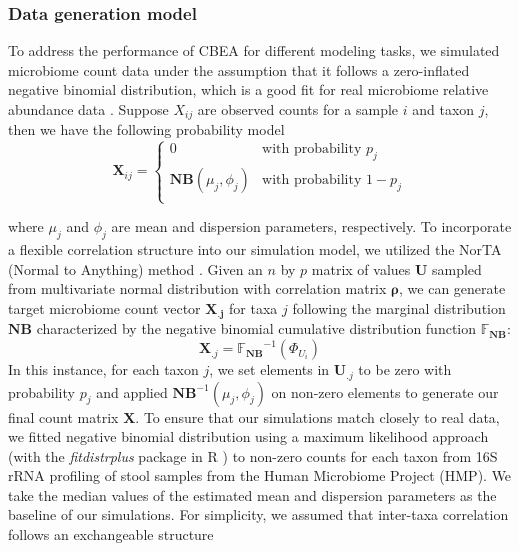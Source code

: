 \documentclass[10pt,letterpaper]{article}
\begin{document}
\subsubsection*{Data generation model}  
To address the performance of CBEA for different modeling tasks, we simulated microbiome count data under the assumption that it follows a zero-inflated negative binomial distribution, which is a good fit for real microbiome relative abundance data \cite{calgaro2020}. Suppose $X_{ij}$ are observed counts for a sample $i$ and taxon $j$, then we have the following probability model
\begin{equation}
    \mathbf{X}_{ij} =
      \begin{cases}
        0 & \text{with probability $p_j$}\\
        \mathbf{NB}(\mu_j, \phi_j) & \text{with probability $1 - p_j$}\\
      \end{cases}       
\end{equation}

where $\mu_j$ and $\phi_j$ are mean and dispersion parameters, respectively. To incorporate a flexible correlation structure into our simulation model, we utilized the NorTA (Normal to Anything) method \cite{cario1997}. Given an $n$ by $p$ matrix of values $\mathbf{U}$ sampled from multivariate normal distribution with correlation matrix $\mathbf{\rho}$, we can generate target microbiome count vector $\mathbf{X_{.j}}$ for taxa $j$ following the marginal distribution $\mathbf{NB}$ characterized by the negative binomial cumulative distribution function $\mathbb{F_{\mathbf{NB}}}$:
\begin{equation}
    \mathbf{X}_{.j} = \mathbb{F_{\mathbf{NB}}}^{-1}(\Phi_{U_i})
\end{equation}
In this instance, for each taxon $j$, we set elements in $\mathbf{U}_{.j}$ to be zero with probability $p_j$ and applied $\mathbf{NB}^{-1}(\mu_j, \phi_j)$ on non-zero elements to generate our final count matrix $\mathbf{X}$. To ensure that our simulations match closely to real data, we fitted negative binomial distribution using a maximum likelihood approach (with the \emph{fitdistrplus} package in R \cite{delignette-muller2015}) to non-zero counts for each taxon from 16S rRNA profiling of stool samples from the Human Microbiome Project (HMP). We take the median values of the estimated mean and dispersion parameters as the baseline of our simulations. For simplicity, we assumed that inter-taxa correlation follows an exchangeable structure
\end{document}
